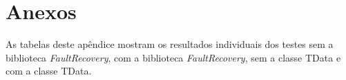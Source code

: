 
\chapter{Anexos} \label{App:ApendiceA}

As tabelas deste apêndice mostram os resultados individuais dos testes sem a biblioteca \textit{FaultRecovery}, com a biblioteca \textit{FaultRecovery}, sem a classe TData e com a classe TData.





